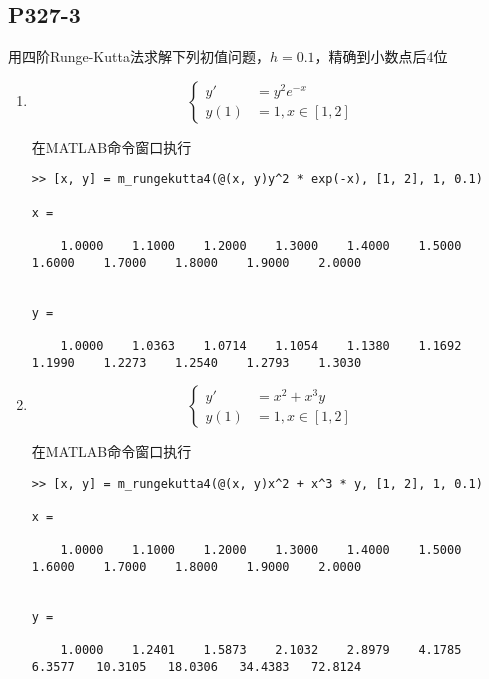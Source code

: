 \subsection{P327-3}
用四阶Runge-Kutta法求解下列初值问题，$h=0.1$，精确到小数点后4位

\begin{enumerate}
\item
\begin{equation*}
\begin{cases}
y' & = y^2 e^{-x} \\
y(1) & = 1, x \in [1, 2]
\end{cases}
\end{equation*}

\begin{SOLVE}
在MATLAB命令窗口执行
\begin{lstlisting}
>> [x, y] = m_rungekutta4(@(x, y)y^2 * exp(-x), [1, 2], 1, 0.1)

x =

    1.0000    1.1000    1.2000    1.3000    1.4000    1.5000    1.6000    1.7000    1.8000    1.9000    2.0000


y =

    1.0000    1.0363    1.0714    1.1054    1.1380    1.1692    1.1990    1.2273    1.2540    1.2793    1.3030

\end{lstlisting}
\end{SOLVE}
\item
\begin{equation*}
\begin{cases}
y' & = x^2 + x^3 y \\
y(1) & = 1, x \in [1, 2]
\end{cases}
\end{equation*}

\begin{SOLVE}
在MATLAB命令窗口执行
\begin{lstlisting}
>> [x, y] = m_rungekutta4(@(x, y)x^2 + x^3 * y, [1, 2], 1, 0.1)

x =

    1.0000    1.1000    1.2000    1.3000    1.4000    1.5000    1.6000    1.7000    1.8000    1.9000    2.0000


y =

    1.0000    1.2401    1.5873    2.1032    2.8979    4.1785    6.3577   10.3105   18.0306   34.4383   72.8124

\end{lstlisting}
\end{SOLVE}
\end{enumerate}